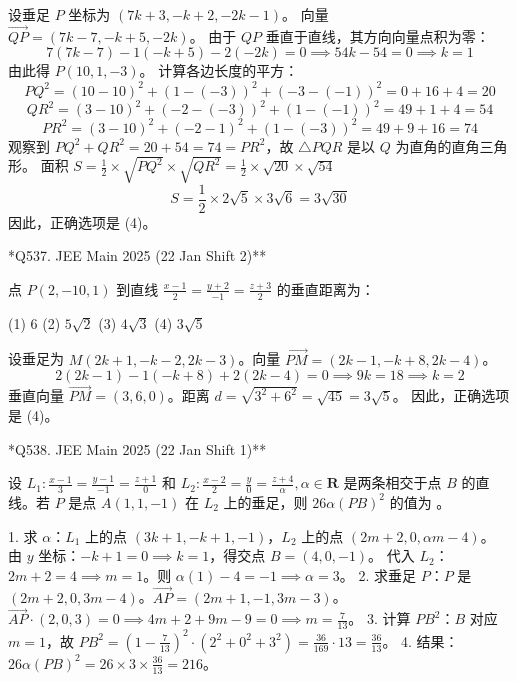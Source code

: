 \begin{questions}
\begin{solution}
设垂足 $P$ 坐标为 $(7k+3, -k+2, -2k-1)$。
向量 $\vec{QP} = (7k-7, -k+5, -2k)$。
由于 $QP$ 垂直于直线，其方向向量点积为零：
\[ 7(7k-7) - 1(-k+5) - 2(-2k) = 0 \implies 54k - 54 = 0 \implies k = 1 \]
由此得 $P(10, 1, -3)$。
计算各边长度的平方：
\[ PQ^2 = (10-10)^2 + (1-(-3))^2 + (-3-(-1))^2 = 0 + 16 + 4 = 20 \]
\[ QR^2 = (3-10)^2 + (-2-(-3))^2 + (1-(-1))^2 = 49 + 1 + 4 = 54 \]
\[ PR^2 = (3-10)^2 + (-2-1)^2 + (1-(-3))^2 = 49 + 9 + 16 = 74 \]
观察到 $PQ^2 + QR^2 = 20 + 54 = 74 = PR^2$，故 $\triangle PQR$ 是以 $Q$ 为直角的直角三角形。
面积 $S = \frac{1}{2} \times \sqrt{PQ^2} \times \sqrt{QR^2} = \frac{1}{2} \times \sqrt{20} \times \sqrt{54}$
\[ S = \frac{1}{2} \times 2\sqrt{5} \times 3\sqrt{6} = 3\sqrt{30} \]
因此，正确选项是 (4)。
\end{solution}

\question **Q537. JEE Main 2025 (22 Jan Shift 2)**

点 $P(2, -10, 1)$ 到直线 $\frac{x-1}{2} = \frac{y+2}{-1} = \frac{z+3}{2}$ 的垂直距离为：

(1) $6$ \quad (2) $5\sqrt{2}$ \quad (3) $4\sqrt{3}$ \quad (4) $3\sqrt{5}$

\begin{solution}
设垂足为 $M(2k+1, -k-2, 2k-3)$。向量 $\vec{PM} = (2k-1, -k+8, 2k-4)$。
\[ 2(2k-1) - 1(-k+8) + 2(2k-4) = 0 \implies 9k = 18 \implies k = 2 \]
垂直向量 $\vec{PM} = (3, 6, 0)$。距离 $d = \sqrt{3^2 + 6^2} = \sqrt{45} = 3\sqrt{5}$。
因此，正确选项是 (4)。
\end{solution}

\question **Q538. JEE Main 2025 (22 Jan Shift 1)**

设 $L_1 : \frac{x-1}{3} = \frac{y-1}{-1} = \frac{z+1}{0}$ 和 $L_2 : \frac{x-2}{2} = \frac{y}{0} = \frac{z+4}{\alpha}, \alpha \in \mathbf{R}$ 是两条相交于点 $B$ 的直线。若 $P$ 是点 $A(1, 1, -1)$ 在 $L_2$ 上的垂足，则 $26\alpha (PB)^2$ 的值为 \underline{\hspace{1cm}}。

\begin{solution}
1. 求 $\alpha$：$L_1$ 上的点 $(3k+1, -k+1, -1)$，$L_2$ 上的点 $(2m+2, 0, \alpha m-4)$。
由 $y$ 坐标：$-k+1=0 \implies k=1$，得交点 $B = (4, 0, -1)$。
代入 $L_2$：$2m+2=4 \implies m=1$。则 $\alpha(1)-4 = -1 \implies \alpha = 3$。
2. 求垂足 $P$：$P$ 是 $(2m+2, 0, 3m-4)$。$\vec{AP} = (2m+1, -1, 3m-3)$。
$\vec{AP} \cdot (2, 0, 3) = 0 \implies 4m+2 + 9m-9 = 0 \implies m = \frac{7}{13}$。
3. 计算 $PB^2$：$B$ 对应 $m=1$，故 $PB^2 = (1 - \frac{7}{13})^2 \cdot (2^2+0^2+3^2) = \frac{36}{169} \cdot 13 = \frac{36}{13}$。
4. 结果：$26\alpha(PB)^2 = 26 \times 3 \times \frac{36}{13} = 216$。
\end{solution}


\end{questions}
